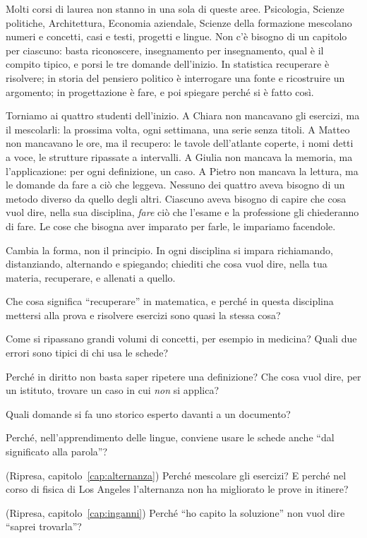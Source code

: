 \asterismo

Molti corsi di laurea non stanno in una sola di queste aree.
Psicologia, Scienze politiche, Architettura, Economia aziendale,
Scienze della formazione mescolano numeri e concetti, casi e testi,
progetti e lingue. Non c'è bisogno di un capitolo per ciascuno: basta
riconoscere, insegnamento per insegnamento, qual è il compito tipico,
e porsi le tre domande dell'inizio. In statistica recuperare è
risolvere; in storia del pensiero politico è interrogare una fonte e
ricostruire un argomento; in progettazione è fare, e poi spiegare
perché si è fatto così.

Torniamo ai quattro studenti dell'inizio. A Chiara non mancavano gli
esercizi, ma il mescolarli: la prossima volta, ogni settimana, una
serie senza titoli. A Matteo non mancavano le ore, ma il recupero: le
tavole dell'atlante coperte, i nomi detti a voce, le strutture ripassate
a intervalli. A Giulia non mancava la memoria, ma l'applicazione: per
ogni definizione, un caso. A Pietro non mancava la lettura, ma le
domande da fare a ciò che leggeva. Nessuno dei quattro aveva bisogno di
un metodo diverso da quello degli altri. Ciascuno aveva bisogno di
capire che cosa vuol dire, nella sua disciplina, \emph{fare} ciò che
l'esame e la professione gli chiederanno di fare. Le cose che bisogna
aver imparato per farle, le impariamo facendole.

\begin{daricordare}
Cambia la forma, non il principio. In ogni disciplina si impara
richiamando, distanziando, alternando e spiegando; chiediti che cosa
vuol dire, nella tua materia, recuperare, e allenati a quello.
\end{daricordare}

\begin{domande}
  \item Che cosa significa \enquote{recuperare} in matematica, e perché
        in questa disciplina mettersi alla prova e risolvere esercizi
        sono quasi la stessa cosa?
  \item Come si ripassano grandi volumi di concetti, per esempio in
        medicina? Quali due errori sono tipici di chi usa le schede?
  \item Perché in diritto non basta saper ripetere una definizione? Che
        cosa vuol dire, per un istituto, trovare un caso in cui
        \emph{non} si applica?
  \item Quali domande si fa uno storico esperto davanti a un documento?
  \item Perché, nell'apprendimento delle lingue, conviene usare le
        schede anche \enquote{dal significato alla parola}?
  \item (Ripresa, capitolo~\ref{cap:alternanza}) Perché mescolare gli
        esercizi? E perché nel corso di fisica di Los Angeles
        l'alternanza non ha migliorato le prove in itinere?
  \item (Ripresa, capitolo~\ref{cap:inganni}) Perché \enquote{ho capito
        la soluzione} non vuol dire \enquote{saprei trovarla}?
\end{domande}

